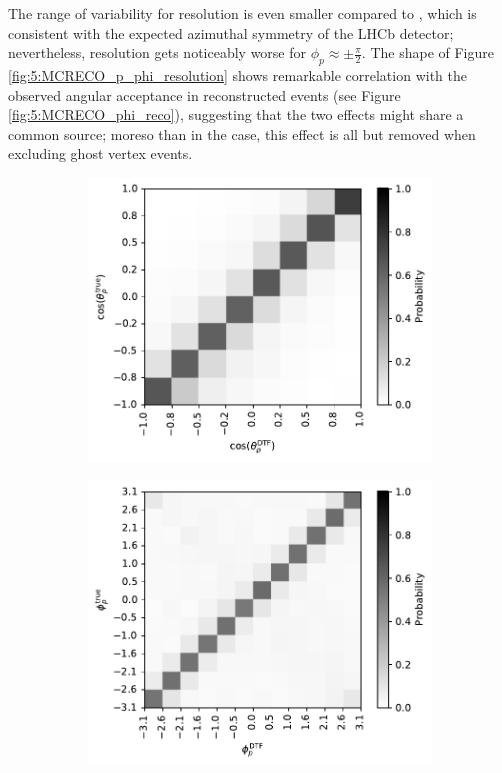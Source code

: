 The range of variability for \phip resolution is even smaller compared to \cthetap, which is consistent with the expected azimuthal symmetry of the LHCb detector;
nevertheless, resolution gets noticeably worse for $\phi_p \approx \pm \frac{\pi}{2}$.
The shape of Figure \ref{fig:5:MCRECO_p_phi_resolution} shows remarkable correlation with the observed angular \phip acceptance in reconstructed events (see Figure \ref{fig:5:MCRECO_phi_reco}), suggesting that the two effects might share a common source;
moreso than in the \cthetap case, this effect is all but removed when excluding ghost vertex events.

\begin{figure}[t]
	\centering
	\begin{subfigure}{.45\textwidth}
		\includegraphics[width=\textwidth]{graphics/05-angular_distributions/MCRECO_p_theta_migration.pdf}
		\caption{}
		\label{fig:5:MCRECO_p_theta_migration}
	\end{subfigure}
	\begin{subfigure}{.45\textwidth}
		\includegraphics[width=\textwidth]{graphics/05-angular_distributions/MCRECO_p_phi_migration.pdf}

\end{subfigure}
\end{figure}
